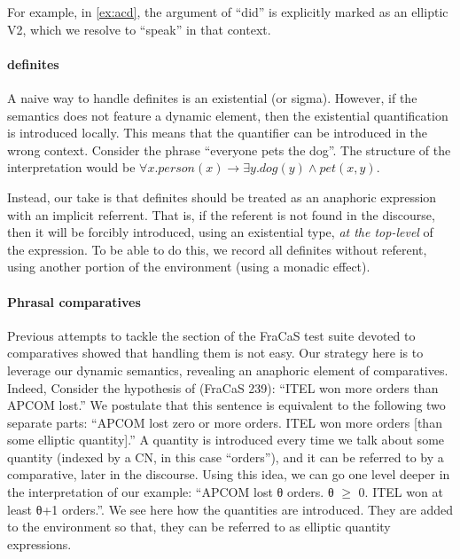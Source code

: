 \documentclass[11pt]{article}
\begin{document}
For example, in \ref{ex:acd}, the argument of ``did'' is
explicitly marked as an elliptic V2, which we resolve to ``speak'' in
that context.
\paragraph{definites} A naive way to handle definites is an
existential (or sigma). However, if the semantics does not feature a
dynamic element, then the existential quantification is introduced
locally. This means that the quantifier can be introduced in the wrong
context. Consider the phrase ``everyone pets the dog''. The structure
of the interpretation would be
$∀x. person(x) → ∃y. dog(y) ∧ pet(x,y)$.

Instead, our take is that definites should be treated as an anaphoric
expression with an implicit referrent. That is, if the referent is not
found in the discourse, then it will be forcibly introduced, using an
existential type, \emph{at the top-level} of the expression. To be
able to do this, we record all definites without referent, using
another portion of the environment (using a monadic effect).

\paragraph{Phrasal comparatives}
Previous attempts to tackle the section of the FraCaS test suite
devoted to comparatives showed that handling them is not easy. Our
strategy here is to leverage our dynamic semantics, revealing an
anaphoric element of comparatives. Indeed, Consider the hypothesis of
(FraCaS 239): ``ITEL won more orders than APCOM lost.''  We postulate
that this sentence is equivalent to the following two separate parts:
``APCOM lost zero or more orders. ITEL won more orders [than some
elliptic quantity].''  A quantity is introduced every time we talk
about some quantity (indexed by a CN, in this case ``orders''), and it
can be referred to by a comparative, later in the discourse. Using
this idea, we can go one level deeper in the interpretation of our
example: ``APCOM lost θ orders. θ $\ge$ 0.  ITEL won at least θ+1
orders.''. We see here how the quantities are introduced. They are
added to the environment so that, they can be referred to as elliptic
quantity expressions.
\end{document}
